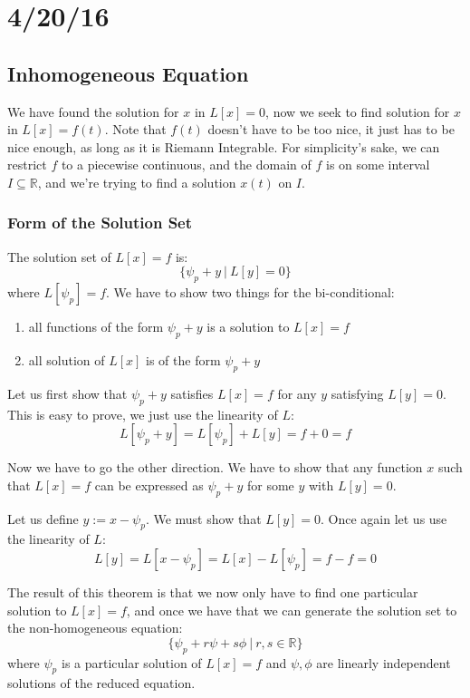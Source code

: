 \documentclass[12pt]{article}
\begin{document}
\section{4/20/16}
\subsection{Inhomogeneous Equation}

We have found the solution for $x$ in $L[x] = 0$, now we seek to find solution
for $x$ in $L[x] = f(t)$. Note that $f(t)$ doesn't have to be too nice, it just
has to be nice enough, as long as it is Riemann Integrable. For simplicity's
sake, we can restrict $f$ to a piecewise continuous, and the domain of $f$ is
on some interval $I \subseteq \mathbb{R}$, and we're trying to find a
solution $x(t)$ on $I$.

\subsubsection{Form of the Solution Set}
The solution set of $L[x] = f$ is:
\[
    \{\psi_p + y \ | \ L[y] = 0\}
\]
where $L[\psi_p] = f$. We have to show two things for
the bi-conditional:
\begin{enumerate}
    \item all functions of the form $\psi_p + y$ is a solution to $L[x] = f$
    \item all solution of $L[x]$ is of the form $\psi_p + y$
\end{enumerate}

Let us first show that $\psi_p + y$ satisfies $L[x] = f$ for any $y$ satisfying
$L[y] = 0$. This is easy to prove, we just use the linearity of $L$:
\[
    L[\psi_p + y] = L[\psi_p] + L[y] = f + 0 = f
\]

Now we have to go the other direction. We have to show that any function $x$
such that $L[x] = f$ can be expressed as $\psi_p + y$ for some $y$ with $L[y] =
0$.

Let us define $y := x - \psi_p$. We must show that $L[y] = 0$. Once again let us
use the linearity of $L$:
\[
    L[y] = L[x - \psi_p] = L[x] - L[\psi_p] = f - f = 0
\]

The result of this theorem is that we now only have to find one particular
solution to $L[x] = f$, and once we have that we can generate the solution set
to the non-homogeneous equation:
\[
    \{\psi_p + r\psi + s\phi \ | \ r, s \in \mathbb{R}\}
\]
where $\psi_p$ is a particular solution of $L[x] = f$ and $\psi, \phi$ are
linearly independent solutions of the reduced equation.
\end{document}
